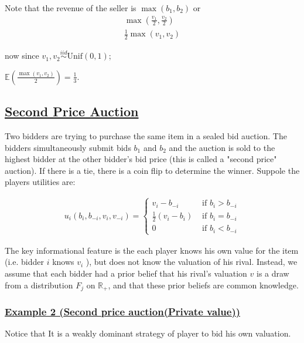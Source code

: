 \documentclass[12pt,a4paper]{article}
\begin{document}
Note that the revenue of the seller is \(\max(b_{1},b_{2})\) or 
\begin{equation*}
    \begin{split}
        \max(\frac{v_{1}}{2},\frac{v_{2}}{2})\\
        \frac{1}{2}\max(v_{1},v_{2})
    \end{split}
\end{equation*}    
 
now since \(v_{1},v_{2} \overset{iid}{\sim} \text{Unif}(0,1)\);

\(\mathbb{E}\left( \frac{\max(v_{1},v_{2})}{2} \right) = \frac{1}{3} \).  

  \subsection*{  \underline{ Second Price Auction }  } 

Two bidders are trying to purchase the same item in a sealed bid auction. The bidders simultaneously submit bids \(b_1\) and \(b_2\) and the auction is sold to the highest bidder at the other bidder's bid price (this is called a "second price" auction). If there is a tie, there is a coin flip to determine the winner. Suppole the players utilities are:

\begin{align*}
u_i\left(b_i, b_{-i}, v_i, v_{-i}\right)= \begin{cases}v_i-b_{-i} & \text { if } b_i>b_{-i} \\ \frac{1}{2}\left(v_i-b_i\right) & \text { if } b_i=b_{-i} \\ 0 & \text { if } b_i<b_{-i}\end{cases}
\end{align*}


The key informational feature is the each player knows his own value for the item (i.e. bidder \(i\) knows \(v_i\) ), but does not know the valuation of his rival. Instead, we assume that each bidder had a prior belief that his rival's valuation \(v\) is a draw from a distribution \(F_j\) on \(\mathbb{R}_{+}\), and that these prior beliefs are common knowledge.

 \subsubsection*{  \underline{ Example 2 (Second price auction(Private value)) } } 

Notice that It is a weakly dominant strategy of player to bid his own valuation.
\end{document}
